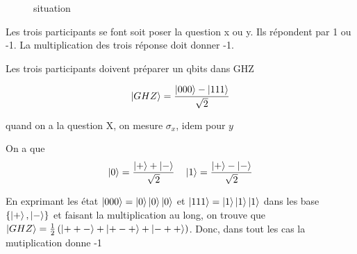 \begin{figure}[ht]
    \centering
    \caption{situation}
    \label{fig:situation}
\end{figure}

Les trois participants se font soit poser la question x ou y. Ils répondent par 1 ou -1. La multiplication des trois réponse doit donner -1. 


Les trois participants doivent préparer un qbits dans GHZ

$$\ket{GHZ} = \frac{\ket{000}-\ket{111}}{\sqrt{2}} $$ 

quand on a la question X, on mesure $\sigma_x$, idem pour $y$  

On a que 
$$\ket{0} = \frac{\ket{+}+\ket{-}}{\sqrt{2}} \quad \ket{1}= \frac{\ket{+}-\ket{-}}{\sqrt{2}} $$ 


En exprimant les état $\ket{000} = \ket{0}\ket{0}\ket{0}$ et $\ket{111}=\ket{1}\ket{1}\ket{1}$ dans les base $ \{ \ket{+}, \ket{-} \}$  et faisant la multiplication au long, on trouve que $\ket{GHZ} = \frac{1}{2} \left( \ket{++-} + \ket{+-+} + \ket{-++} \right) $. Donc, dans tout les cas la mutiplication donne -1




